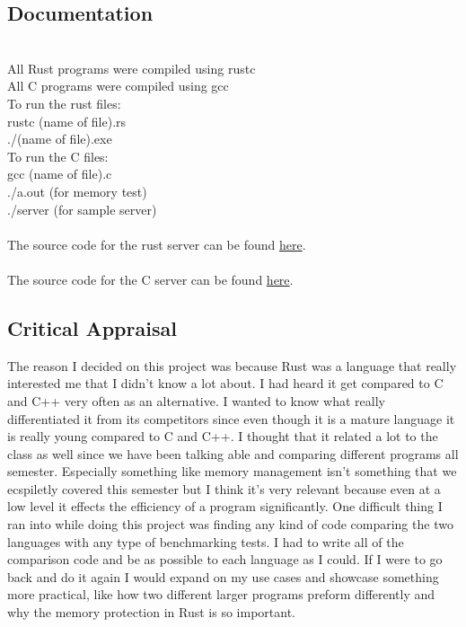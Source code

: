 \documentclass{article}
\theoremstyle{theorem}
\theoremstyle{definition}
\theoremstyle{remark}
\begin{document}
\subsection{Documentation}
\\All Rust programs were compiled using rustc
\\All C programs were compiled using gcc
\\To run the rust files:
\\rustc (name of file).rs
\\./(name of file).exe
\\To run the C files:
\\gcc (name of file).c
\\./a.out (for memory test)
\\./server (for sample server)
\\
\\The source code for the rust server can be found \href{https://gist.github.com/mjohnsullivan/e5182707caf0a9dbdf2d}{here}.
\\
\\The source code for the C server can be found \href{https://gist.github.com/laobubu/d6d0e9beb934b60b2e552c2d03e1409e}{here}.

\subsection{Critical Appraisal}
The reason I decided on this project was because Rust was a language that really interested me that I didn't know a lot about. 
I had heard it get compared to C and C++ very often as an alternative. I wanted to know what really differentiated it from its competitors since even though it is a mature language it is really young compared to C and C++.
I thought that it related a lot to the class as well since we have been talking able and comparing different programs all semester. Especially something like memory management isn't something that we ecspiletly covered this semester but I think it's very relevant because even at a low level it effects the efficiency of a program significantly.
One difficult thing I ran into while doing this project was finding any kind of code comparing the two languages with any type of benchmarking tests. I had to write all of the comparison code and be as possible to each language as I could.
If I were to go back and do it again I would expand on my use cases and showcase something more practical, like how two different larger programs preform differently and why the memory protection in Rust is so important.
  
\end{document}
